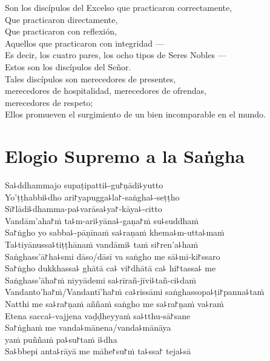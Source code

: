 \begin{leader}
\end{leader}

Son los discípulos del Excelso que practicaron correctamente,\\
Que practicaron directamente,\\
Que practicaron con reflexión,\\
Aquellos que practicaron con integridad ---\\
Es decir, los cuatro pares, los ocho tipos de Seres Nobles ---\\
Estos son los discípulos del Señor.\\
Tales discípulos son merecedores de presentes,\\
\vin merecedores de hospitalidad, merecedores de ofrendas,\\
\vin merecedores de respeto;\\
Ellos promueven el surgimiento de un bien incomparable en el mundo.

\clearpage

\chapter*{Elogio Supremo a la Saṅgha}

\begin{leader}
\end{leader}

Sa꜕ddhammajo supaṭipatti꜕-gu꜓ṇādi꜕yutto\\
Yo'ṭṭhabbi꜕dho ari꜓yapugga꜕la꜓-saṅgha꜕-seṭṭho\\
Sī꜓lādi꜕dhamma-pa꜕varāsa꜕ya꜓-kāya꜕-citto\\
Vandām'aha꜓ṁ ta꜕m-ari꜕yāna꜕-gaṇa꜓ṁ su꜕suddhaṁ\\
Sa꜓ṅgho yo sabba꜕-pāṇīnaṁ sa꜕raṇaṁ khema꜕m-utta꜕maṁ\\
Ta꜕tiyānussa꜕tiṭṭhānaṁ vandāmi꜕ taṁ si꜓ren'a꜕haṁ\\
Saṅghass'ā꜓ha꜕smi dāso/dāsī va saṅgho me sā꜕mi-ki꜓ssaro\\
Sa꜓ṅgho dukkhassa꜕ ghātā ca꜕ vi꜓dhātā ca꜕ hi꜓tassa꜕ me\\
Saṅghass'āha꜓ṁ niyyādemi sa꜕rīrañ-jīvi꜕tañ-ci꜕daṁ\\
Vandanto'ha꜓ṁ/Vandantī'ha꜓ṁ ca꜕rissāmi saṅghassopa꜕ṭi꜓panna꜕taṁ\\
Natthi me sa꜕ra꜓ṇaṁ aññaṁ saṅgho me sa꜕ra꜓ṇaṁ va꜕raṁ\\
Etena sacca꜕-vajjena vaḍḍheyyaṁ sa꜕tthu-sā꜓sane\\
Sa꜓ṅghaṁ me vanda꜕mānena/vanda꜕mānāya\\
\vin yaṁ puññaṁ pa꜕su꜓taṁ i꜕dha\\
Sa꜕bbepi anta꜕rāyā me māhe꜓su꜓ṁ ta꜕ssa꜓ teja꜕sā

